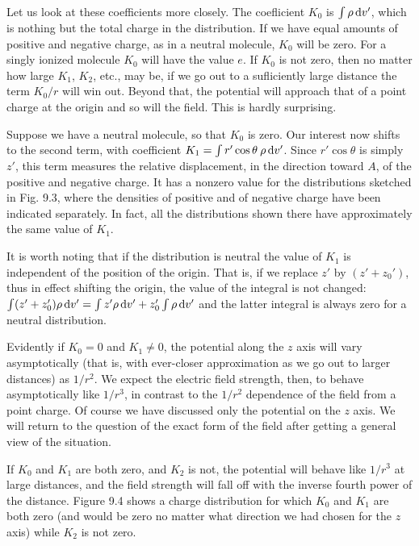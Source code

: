 Let us look at these coefficients more closely. The coeflicient $K_0$
is $\int\rho\operatorname{d\!} v'$, which is nothing but the total charge in the distribution.
If we have equal amounts of positive and negative charge, as in a
neutral molecule, $K_0$ will be zero. For a singly ionized molecule $K_0$
will have the value $e$. If $K_0$ is not zero, then no matter how large
$K_1$, $K_2$, etc., may be, if we go out to a sufliciently large distance the
term $K_0/ r$ will win out. Beyond that, the potential will approach that
of a point charge at the origin and so will the field. This is hardly
surprising.

Suppose we have a neutral molecule, so that $K_0$ is zero. Our interest
now shifts to the second term, with coefficient $K_1 = \int r'\cos\theta\:\rho\operatorname{d\!} v'$.
Since $r' \cos \theta$ is simply $z'$, this term measures the relative 
displacement, in the direction toward $A$, of the positive and negative charge.
It has a nonzero value for the distributions sketched in Fig. 9.3, where
the densities of positive and of negative charge have been indicated
separately. In fact, all the distributions shown there have approximately
the same value of $K_1$.

It is worth noting that if the distribution is neutral the value of $K_1$
is independent of the position of the origin. That is, if we replace
$z'$ by $(z' + z_0')$, thus in effect shifting the origin, the value of the integral
is not changed: $\int(z' + z_0')\rho\operatorname{d\!} v' = \int z'\rho\operatorname{d\!} v' + z_0'\int\rho\operatorname{d\!} v'$ and the
latter integral is always zero for a neutral distribution.

Evidently if $K_0 = 0$ and $K_1\ne 0$, the potential along the $z$ axis will
vary asymptotically (that is, with ever-closer approximation as we
go out to larger distances) as $1/r^2$. We expect the electric field
strength, then, to behave asymptotically like $1/r^3$, in contrast to the
$1 /r^2$ dependence of the field from a point charge. Of course we have
discussed only the potential on the $z$ axis. We will return to the question
of the exact form of the field after getting a general view of the
situation.


If $K_0$ and $K_1$ are both zero, and $K_2$ is not, the potential will behave
like $1/r^3$ at large distances, and the field strength will fall off with
the inverse fourth power of the distance. Figure 9.4 shows a charge
distribution for which $K_0$ and $K_1$ are both zero (and would be zero
no matter what direction we had chosen for the $z$ axis) while $K_2$ is
not zero.

